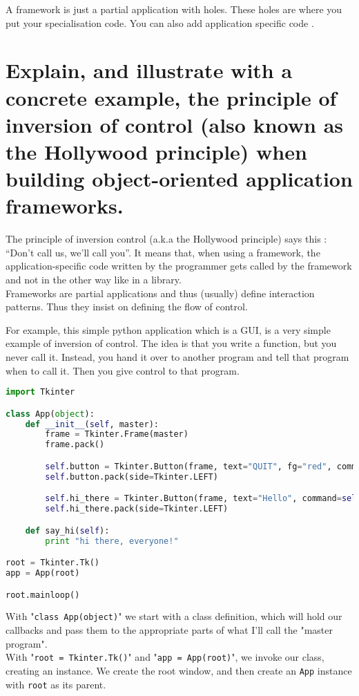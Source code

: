 A framework is just a partial application with holes. These holes are where you put your specialisation code. You can also add application specific code .

\section{Explain, and illustrate with a concrete example, the principle of inversion of control (also
known as the Hollywood principle) when building object-oriented application frameworks.}
The principle of inversion control (a.k.a the Hollywood principle) says this : “Don’t call us, we’ll call you”.
It means that, when using a framework, the application-specific code written by the programmer gets called by the framework and not in the other way like in a library.\\

Frameworks are partial applications  and thus (usually) define interaction patterns. Thus they insist on defining the flow of control.

For example, this simple python application which is a GUI, is a very simple example of inversion of control. The idea is that you write a function, but you never call it. Instead, you hand it over to another program and tell that program when to call it. Then you give control to that program.
\begin{lstlisting}[language=python]
import Tkinter

class App(object):
    def __init__(self, master):
        frame = Tkinter.Frame(master)
        frame.pack()

        self.button = Tkinter.Button(frame, text="QUIT", fg="red", command=frame.quit)
        self.button.pack(side=Tkinter.LEFT)

        self.hi_there = Tkinter.Button(frame, text="Hello", command=self.say_hi)
        self.hi_there.pack(side=Tkinter.LEFT)

    def say_hi(self):
        print "hi there, everyone!"

root = Tkinter.Tk()
app = App(root)

root.mainloop()
\end{lstlisting}

With "\texttt{class App(object)}" we start with a class definition, which will hold our callbacks and pass them to the appropriate parts of what I'll call the "master program".\\

With "\texttt{root = Tkinter.Tk()}" and "\texttt{app = App(root)}", we invoke our class, creating an instance. We create the root window, and then create an \texttt{App} instance with \texttt{root} as its parent.\\

